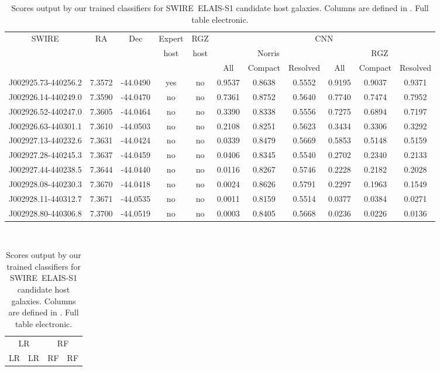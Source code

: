   \begin{table}
    \caption[Scores output by our trained classifiers for SWIRE~ELAIS-S1 candidate host galaxies.]{Scores output by our trained classifiers for SWIRE~ELAIS-S1 candidate host galaxies. Columns are defined in . Full table electronic.}
    \label{tab:elais-scores}
    \small\centering
    \begin{tabular}{ccccccccccc}
      \hline\hline
SWIRE & RA & Dec & Expert & RGZ & \multicolumn{6}{c}{CNN} \\
 & & & host & host & \multicolumn{3}{c}{Norris} & \multicolumn{3}{c}{RGZ} \\
 & & & & & All & Compact & Resolved & All & Compact & Resolved \\
      \hline
J002925.73-440256.2 & 7.3572 & -44.0490 & yes & no & 0.9537 & 0.8638 & 0.5552 & 0.9195 & 0.9037 & 0.9371\\
J002926.14-440249.0 & 7.3590 & -44.0470 & no & no & 0.7361 & 0.8752 & 0.5640 & 0.7740 & 0.7474 & 0.7952\\
J002926.52-440247.0 & 7.3605 & -44.0464 & no & no & 0.3390 & 0.8338 & 0.5556 & 0.7275 & 0.6894 & 0.7197\\
J002926.63-440301.1 & 7.3610 & -44.0503 & no & no & 0.2108 & 0.8251 & 0.5623 & 0.3434 & 0.3306 & 0.3292\\
J002927.13-440232.6 & 7.3631 & -44.0424 & no & no & 0.0339 & 0.8479 & 0.5669 & 0.5853 & 0.5148 & 0.5159\\
J002927.28-440245.3 & 7.3637 & -44.0459 & no & no & 0.0406 & 0.8345 & 0.5540 & 0.2702 & 0.2340 & 0.2133\\
J002927.44-440238.5 & 7.3644 & -44.0440 & no & no & 0.0116 & 0.8267 & 0.5746 & 0.2228 & 0.2182 & 0.2028\\
J002928.08-440230.3 & 7.3670 & -44.0418 & no & no & 0.0024 & 0.8626 & 0.5791 & 0.2297 & 0.1963 & 0.1549\\
J002928.11-440312.7 & 7.3671 & -44.0535 & no & no & 0.0011 & 0.8159 & 0.5514 & 0.0377 & 0.0384 & 0.0271\\
J002928.80-440306.8 & 7.3700 & -44.0519 & no & no & 0.0003 & 0.8405 & 0.5668 & 0.0236 & 0.0226 & 0.0136\\
      \hline\hline
    \end{tabular}\\
    \begin{tabular}{cccccccccccc}
      \hline\hline
\multicolumn{6}{c}{LR} & \multicolumn{6}{c}{RF} \\
\multicolumn{3}{c}{LR} & \multicolumn{3}{c}{LR} & \multicolumn{3}{c}{RF} & \multicolumn{3}{c}{RF} \\

\end{tabular}
\end{table}
